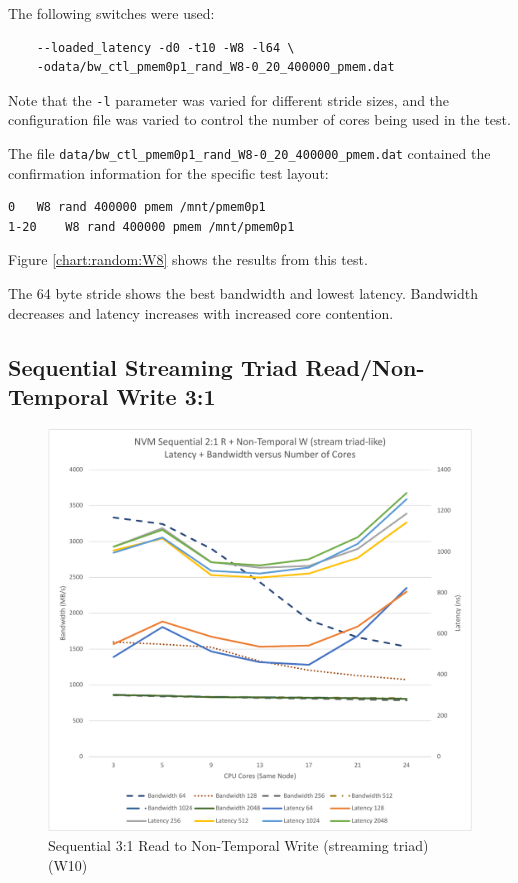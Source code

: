 The following switches were used:

\begin{verbatim}
    --loaded_latency -d0 -t10 -W8 -l64 \
    -odata/bw_ctl_pmem0p1_rand_W8-0_20_400000_pmem.dat
\end{verbatim}

Note that the \verb+-l+ parameter was varied for different
stride sizes, and the configuration file was varied to control
the number of cores being used in the test.

The file \verb+data/bw_ctl_pmem0p1_rand_W8-0_20_400000_pmem.dat+ contained the confirmation information
for the specific test layout:

\begin{verbatim}
0	W8 rand 400000 pmem /mnt/pmem0p1
1-20	W8 rand 400000 pmem /mnt/pmem0p1
\end{verbatim}

Figure \ref{chart:random:W8} shows the results from this test.

The 64 byte stride shows the best bandwidth and lowest latency.
Bandwidth decreases and latency increases with increased core
contention.


\subsection{Sequential Streaming Triad Read/Non-Temporal Write 3:1}


\begin{figure}
    \centering
    \caption{Sequential 3:1 Read to Non-Temporal Write (streaming triad) (W10)}\label{chart:sequential:W10}
    \includegraphics[scale=0.5]{charts/sequential-w10-crop.pdf}
\end{figure}

